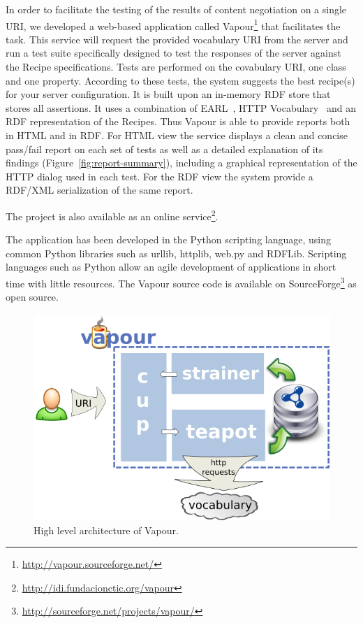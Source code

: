 \documentclass{../templates/llncs}
\begin{document}
In order to facilitate the testing of the results of content negotiation on a single 
URI, we developed a web-based application called Vapour\footnote{\url{http://vapour.sourceforge.net/}}
that facilitates the task. This service will request the provided vocabulary 
URI from the server and run a test suite specifically designed to test the responses 
of the server against the Recipe specifications. Tests are performed on the covabulary
URI, one class and one property. According to these tests, the system suggests the 
best recipe(s) for your server configuration. It is built upon an in-memory RDF store
that stores all assertions. It uses a combination of EARL~\cite{EARL}, HTTP
Vocabulary~\cite{Koch2007} and an RDF representation of the Recipes. Thus Vapour 
is able to provide reports both in HTML and in RDF. For HTML view the service 
displays a clean and concise pass/fail report on each set of tests 
as  well as a detailed explanation of its  findings (Figure~\ref{fig:report-summary}), 
including a graphical representation of the HTTP dialog used in each test.
For the RDF view %
the system provide a RDF/XML serialization of the same report.

The project is also available as an online service\footnote{\url{http://idi.fundacionctic.org/vapour}}.

The application has been developed in the Python scripting language, using common
Python libraries such as urllib, httplib, web.py and RDFLib. Scripting languages such 
as Python allow an agile development of applications in short time with little 
resources. The Vapour source code is available on 
SourceForge\footnote{\url{http://sourceforge.net/projects/vapour/}} 
as open source.

\begin{figure}
 \centering
 \includegraphics[width=12cm]{images/arch.png}
 \caption{\label{fig:arch}High level architecture of Vapour.}
\end{figure}
\end{document}
